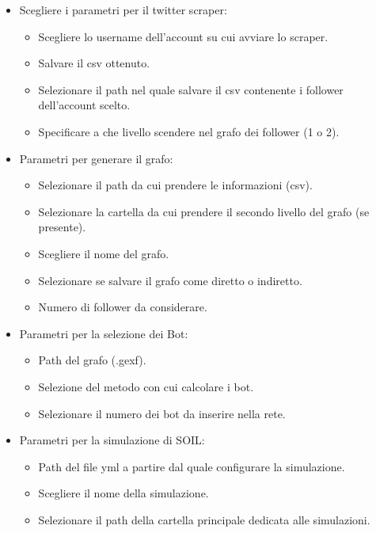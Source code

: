           \begin{itemize}
            \item Scegliere i parametri per il twitter scraper:
              \begin{itemize}
                \item Scegliere lo username dell'account su cui avviare lo scraper.
                \item Salvare il csv ottenuto.
                \item Selezionare il path nel quale salvare il csv contenente i follower dell'account scelto.
                \item Specificare a che livello scendere nel grafo dei follower (1 o 2).
              \end{itemize}
            \item Parametri per generare il grafo:
              \begin{itemize}
                \item Selezionare il path da cui prendere le informazioni (csv).
                \item Selezionare la cartella da cui prendere il secondo livello del grafo (se presente).
                \item Scegliere il nome del grafo.
                \item Selezionare se salvare il grafo come diretto o indiretto.
                \item Numero di follower da considerare.
              \end{itemize}
            \item Parametri per la selezione dei Bot:
              \begin{itemize}
                \item Path del grafo (.gexf).
                \item Selezione del metodo con cui calcolare i bot.
                \item Selezionare il numero dei bot da inserire nella rete.
              \end{itemize}
            \item Parametri per la simulazione di SOIL:
              \begin{itemize}
                \item Path del file yml a partire dal quale configurare la simulazione.
                \item Scegliere il nome della simulazione.
                \item Selezionare il path della cartella principale dedicata alle simulazioni.

\end{itemize}
\end{itemize}
